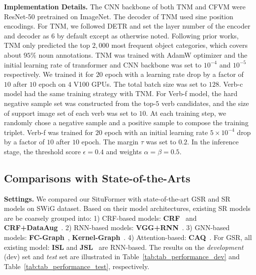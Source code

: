 \documentclass[letterpaper]{article} \usepackage{aaai22}  \usepackage{times}  \usepackage{helvet}  \usepackage{courier}  \usepackage[hyphens]{url}  \usepackage{graphicx} \urlstyle{rm} \def\UrlFont{\rm}  \usepackage{natbib}  \usepackage{caption} \DeclareCaptionStyle{ruled}{labelfont=normalfont,labelsep=colon,strut=off} \frenchspacing  \setlength{\pdfpagewidth}{8.5in}  \setlength{\pdfpageheight}{11in}
\begin{document}
\noindent \textbf{Implementation Details.}
The CNN backbone of both TNM and CFVM were ResNet-50 pretrained on ImageNet. The decoder of TNM used sine position encodings. For TNM, we followed DETR and set the layer number of the encoder and decoder as $6$ by default except as otherwise noted. Following prior works, TNM only predicted the top $2,000$ most frequent object categories, which covers about $95\%$ noun annotations. TNM was trained with AdamW optimizer and the initial learning rate of transformer and CNN backbone was set to $10^{-4}$ and $10^{-5}$ respectively. We trained it for $20$ epoch with a learning rate drop by a factor of $10$ after $10$ epoch on $4$ V100 GPUs. The total batch size was set to $128$. Verb-c model had the same training strategy with TNM. For Verb-f model, the hard negative sample set was constructed from the top-$5$ verb candidates, and the size of support image set of each verb was set to $10$.
At each training step, we randomly chose a negative sample and a positive sample to compose the training triplet. Verb-f was trained for $20$ epoch with an initial learning rate $5 \times 10^{-4}$ drop by a factor of $10$ after $10$ epoch. The margin $\tau$ was set to $0.2$. In the inference stage, the threshold score $\epsilon=0.4$ and weights $\alpha = \beta = 0.5$.  














\subsection{Comparisons with State-of-the-Arts}
\noindent\textbf{Settings.} We compared our SituFormer with state-of-the-art GSR and SR models on SWiG dataset. Based on their model architectures, existing SR models are be coarsely grouped into: 1) CRF-based models: \textbf{CRF}~\cite{yatskar2016situation} and \textbf{CRF+DataAug}~\cite{yatskar2017commonly}. 2) RNN-based models: \textbf{VGG+RNN}~\cite{mallya2017recurrent}. 3) GNN-based models: \textbf{FC-Graph}~\cite{li2017situation}, \textbf{Kernel-Graph}~\cite{suhail2019mixture}. 4) Attention-based: \textbf{CAQ}~\cite{9156513}. For GSR, all existing model: \textbf{ISL} and \textbf{JSL}~\cite{pratt2020grounded} are RNN-based. The results on the \textit{development} (dev) set and \emph{test} set are illustrated in Table~\ref{tab:tab_performance_dev} and Table~\ref{tab:tab_performance_test}, respectively. 
\end{document}

